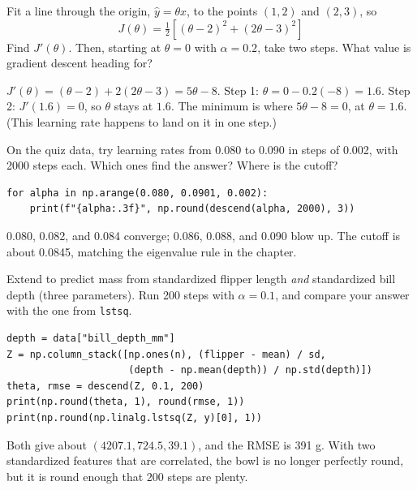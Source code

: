 \begin{Exercise}[label=gd3, title={A one-parameter mountain}, space=4cm]
Fit a line through the origin, $\hat{y} = \theta x$, to the points $(1, 2)$ and $(2, 3)$, so
$$J(\theta) = \tfrac{1}{2}\left[(\theta - 2)^2 + (2\theta - 3)^2\right]$$
Find $J'(\theta)$. Then, starting at $\theta = 0$ with $\alpha = 0.2$, take two steps. What value is gradient descent heading for?
\end{Exercise}
\begin{Answer}[ref=gd3]
$J'(\theta) = (\theta - 2) + 2(2\theta - 3) = 5\theta - 8$. Step 1: $\theta = 0 - 0.2(-8) = 1.6$. Step 2:
$J'(1.6) = 0$, so $\theta$ stays at $1.6$. The minimum is where $5\theta - 8 = 0$, at $\theta = 1.6$. (This
learning rate happens to land on it in one step.)
\end{Answer}

\begin{Exercise}[label=gd4, title={Find the cliff}]
On the quiz data, try learning rates from 0.080 to 0.090 in steps of 0.002, with 2000 steps each. Which
ones find the answer? Where is the cutoff?
\end{Exercise}
\begin{Answer}[ref=gd4]
\begin{verbatim}
for alpha in np.arange(0.080, 0.0901, 0.002):
    print(f"{alpha:.3f}", np.round(descend(alpha, 2000), 3))
\end{verbatim}
0.080, 0.082, and 0.084 converge; 0.086, 0.088, and 0.090 blow up. The cutoff is about 0.0845, matching the
eigenvalue rule in the chapter.
\end{Answer}

\begin{Exercise}[label=gd5, title={Two features}]
Extend  to predict mass from standardized flipper length \emph{and} standardized
bill depth (three parameters). Run 200 steps with $\alpha = 0.1$, and compare your answer with the
one from \verb|lstsq|.
\end{Exercise}
\begin{Answer}[ref=gd5]
\begin{verbatim}
depth = data["bill_depth_mm"]
Z = np.column_stack([np.ones(n), (flipper - mean) / sd,
                     (depth - np.mean(depth)) / np.std(depth)])
theta, rmse = descend(Z, 0.1, 200)
print(np.round(theta, 1), round(rmse, 1))
print(np.round(np.linalg.lstsq(Z, y)[0], 1))
\end{verbatim}
Both give about $(4207.1, 724.5, 39.1)$, and the RMSE is 391 g. With two standardized features that are
correlated, the bowl is no longer perfectly round, but it is round enough that 200 steps are plenty.
\end{Answer}

